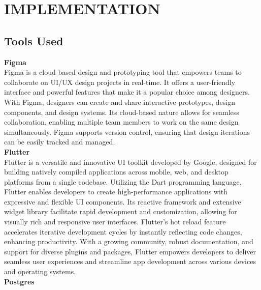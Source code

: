 \chapter{IMPLEMENTATION}





\section{Tools Used}
\textbf{Figma}\\
Figma is a cloud-based design and prototyping tool that empowers teams to collaborate on UI/UX design projects in real-time. It offers a user-friendly interface and powerful features that make it a popular choice among designers. With Figma, designers can create and share interactive prototypes, design components, and design systems. Its cloud-based nature allows for seamless collaboration, enabling multiple team members to work on the same design simultaneously. Figma supports version control, ensuring that design iterations can be easily tracked and managed. \\
\textbf{Flutter}\\
Flutter is a versatile and innovative UI toolkit developed by Google, designed for building natively compiled applications across mobile, web, and desktop platforms from a single codebase. Utilizing the Dart programming language, Flutter enables developers to create high-performance applications with expressive and flexible UI components. Its reactive framework and extensive widget library facilitate rapid development and customization, allowing for visually rich and responsive user interfaces. Flutter's hot reload feature accelerates iterative development cycles by instantly reflecting code changes, enhancing productivity. With a growing community, robust documentation, and support for diverse plugins and packages, Flutter empowers developers to deliver seamless user experiences and streamline app development across various devices and operating systems.\\
\textbf{Postgres}\\
